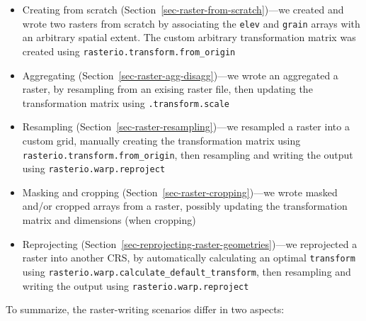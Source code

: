 \documentclass[
  letterpaper,
]{krantz}
\providecommand{\tightlist}{%
  \setlength{\itemsep}{0pt}\setlength{\parskip}{0pt}}\usepackage{longtable,booktabs,array}
\begin{document}
\begin{itemize}
\tightlist
\item
  Creating from scratch (Section~\ref{sec-raster-from-scratch})---we
  created and wrote two rasters from scratch by associating the
  \texttt{elev} and \texttt{grain} arrays with an arbitrary spatial
  extent. The custom arbitrary transformation matrix was created using
  \texttt{rasterio.transform.from\_origin}
\item
  Aggregating (Section~\ref{sec-raster-agg-disagg})---we wrote an
  aggregated a raster, by resampling from an exising raster file, then
  updating the transformation matrix using \texttt{.transform.scale}
\item
  Resampling (Section~\ref{sec-raster-resampling})---we resampled a
  raster into a custom grid, manually creating the transformation matrix
  using \texttt{rasterio.transform.from\_origin}, then resampling and
  writing the output using \texttt{rasterio.warp.reproject}
\item
  Masking and cropping (Section~\ref{sec-raster-cropping})---we wrote
  masked and/or cropped arrays from a raster, possibly updating the
  transformation matrix and dimensions (when cropping)
\item
  Reprojecting (Section~\ref{sec-reprojecting-raster-geometries})---we
  reprojected a raster into another CRS, by automatically calculating an
  optimal \texttt{transform} using
  \texttt{rasterio.warp.calculate\_default\_transform}, then resampling
  and writing the output using \texttt{rasterio.warp.reproject}
\end{itemize}

To summarize, the raster-writing scenarios differ in two aspects:
\end{document}
